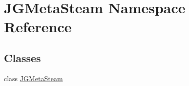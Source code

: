 \hypertarget{namespace_j_g_meta_steam}{\section{J\+G\+Meta\+Steam Namespace Reference}
\label{namespace_j_g_meta_steam}
}
\subsection*{Classes}
\begin{DoxyCompactItemize}
\item 
class \hyperlink{class_j_g_meta_steam_1_1_j_g_meta_steam}{J\+G\+Meta\+Steam}
\end{DoxyCompactItemize}
